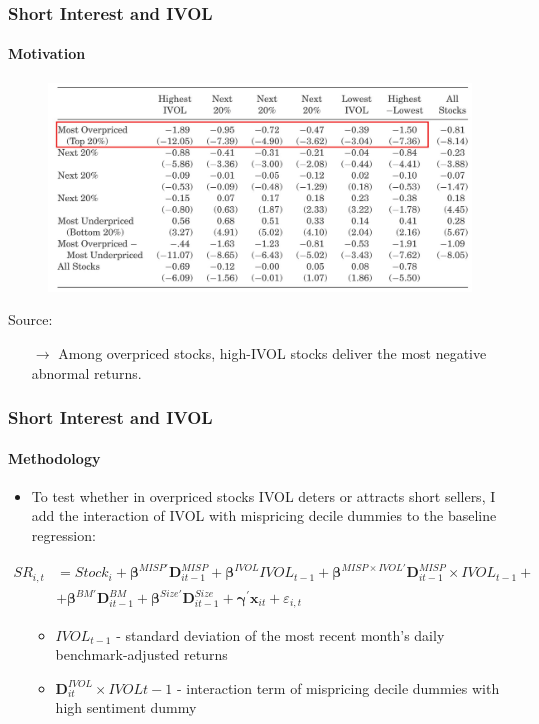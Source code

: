 \documentclass{beamer}
\begin{document}
\begin{frame}
	\frametitle{Short Interest and IVOL}
		\framesubtitle{Motivation}
\begin{figure}[htbp]
\centering
	\includegraphics[scale=0.9,trim=1 1 1 1,clip]{figures/motivation_ivol.jpg} 
	\label{tab:SHO_misp_graph}%
\end{figure}
\vspace*{-0.6 cm}
{\tiny \qquad Source: \citet{Stambaugh2015}}
	\begin{itemize}
		\item[$\rightarrow$] Among overpriced stocks, high-IVOL stocks deliver the most negative abnormal returns.  
	\end{itemize}
\end{frame}  

\begin{frame}
	\frametitle{Short Interest and IVOL}
		\framesubtitle{Methodology}	
	\begin{itemize}
		\item To test whether in overpriced stocks IVOL deters or attracts short sellers, I add the interaction of IVOL with mispricing decile dummies to the baseline regression:
	\end{itemize}
{\scriptsize
		\begin{equation}		 \nonumber
		\begin{split}
			SR_{i,t} &= Stock_i+\bm{\beta}^{MISP\prime}  \bm{D}^{MISP}_{it-1}+ \bm{\beta}^{IVOL} IVOL_{t-1} + \bm{\beta}^{MISP \times IVOL\prime}  \bm{D}^{MISP}_{it-1} \times IVOL_{t-1} + \\ 
			&+ \bm{\beta}^{BM\prime}  \bm{D}^{BM}_{it-1}+\bm{\beta}^{Size\prime} \bm{D}^{Size}_{it-1}  +\bm{\gamma}^\prime \bm{x}_{it} + \varepsilon_{i,t}
		\end{split}
		\end{equation}
}
\begin{itemize}
\item[]
\begin{itemize}
	\item $IVOL_{t-1}$ - standard deviation of the most recent month’s daily benchmark-adjusted returns \citep{Stambaugh2015}
	\item $\bm{D}^{IVOL}_{it} \times IVOL{t-1}$ - interaction term of mispricing decile dummies with high sentiment dummy
\end{itemize}
\end{itemize}
\end{frame}  
\end{document}
